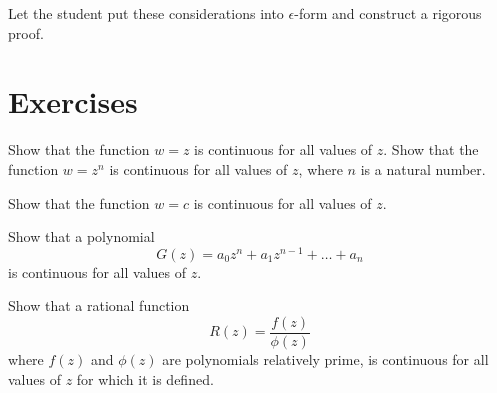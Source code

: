 \documentclass[twosided]{memoir}
\begin{document}
Let the student put these considerations into $\epsilon$-form and construct a rigorous proof.

\section*{Exercises}
\problem Show that the function $w=z$ is continuous for all values of $z$. 
\problem Show that the function $w=z^n$ is continuous for all values of $z$, where $n$ is a natural number. 

\problem Show that the function $w=c$ is continuous for all values of $z$. 

\problem Show that a polynomial
\[
	G(z)=a_0z^n+a_1z^{n-1}+\dots +a_n
\] is continuous for all values of $z$. 

\problem Show that a rational function
\[
	R(z)=\frac{f(z)}{\phi (z)} 
\] where $f(z)$ and $\phi (z)$ are polynomials relatively prime, is continuous for all values of $z$ for which it is defined. 
\end{document}
